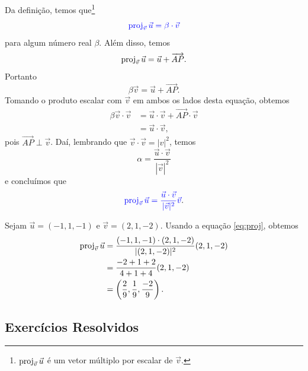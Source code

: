 Da definição, temos que\footnote{$\operatorname{proj}_{\vec{v}}\vec{u}$ é um vetor múltiplo por escalar de $\vec{v}$.}
\begin{equation}
  {\color{blue}\operatorname{proj}_{\vec{v}}\vec{u} = \beta\cdot \vec{v}}
\end{equation}
para algum número real $\beta$. Além disso, temos
\begin{equation}
  \operatorname{proj}_{\vec{v}}\vec{u} = \vec{u} + \overrightarrow{AP}.
\end{equation}
Portanto
\begin{equation}
  \beta\vec{v} = \vec{u} + \overrightarrow{AP}.
\end{equation}
Tomando o produto escalar com $\vec{v}$ em ambos os lados desta equação, obtemos
\begin{align}
  \beta\vec{v}\cdot\vec{v} &= \vec{u}\cdot\vec{v} + \overrightarrow{AP}\cdot\vec{v} \\
  &= \vec{u}\cdot\vec{v},
\end{align}
pois $\overrightarrow{AP}\perp\vec{v}$. Daí, lembrando que $\vec{v}\cdot\vec{v}=|v|^2$, temos
\begin{equation}
  \alpha = \frac{\vec{u}\cdot\vec{v}}{|\vec{v}|^2}
\end{equation}
e concluímos que
\begin{equation}\label{eq:proj}
  {\color{blue}\operatorname{proj}_{\vec{v}}\vec{u} = \frac{\vec{u}\cdot\vec{v}}{|\vec{v}|^2}\vec{v}}.
\end{equation}

\begin{ex}
  Sejam $\vec{u}=(-1,1,-1)$ e $\vec{v}=(2,1,-2)$. Usando a equação \eqref{eq:proj}, obtemos
  \begin{align}
    \operatorname{proj}_{\vec{v}}\vec{u} &= \frac{(-1,1,-1)\cdot(2,1,-2)}{|(2,1,-2)|^2}(2,1,-2)\\
                           &= \frac{-2+1+2}{4+1+4}(2,1,-2)\\
                           &= \left(\frac{2}{9},\frac{1}{9},\frac{-2}{9}\right).
  \end{align}
\end{ex}

\subsection{Exercícios Resolvidos}

